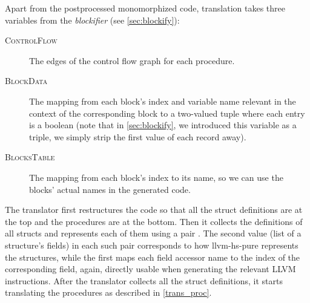 Apart from the postprocessed monomorphized code, translation takes three variables from the \emph{blockifier} (see \cref{sec:blockify}):

\begin{description}
    \item[\textsc{ControlFlow}] The edges of the control flow graph for each procedure.
    \item[\textsc{BlockData}] The mapping from each block's index and variable name relevant in the context of the corresponding block to a two-valued tuple \linebreak {} where each entry is a boolean (note that in \cref{sec:blockify}, we introduced this variable as a triple, we simply strip the first value of each record away).
    \item[\textsc{BlocksTable}] The mapping from each block's index to its name, so we can use the blocks' actual names in the generated code.
\end{description}

\sloppy The translator first restructures the code so that all the struct definitions are at the top and the procedures are at the bottom. Then it collects the definitions of all structs and represents each of them using a pair  . The second value (list of a structure's fields) in each such pair corresponds to how llvm-hs-pure represents the structures, while the first maps each field accessor name to the index of the corresponding field, again, directly usable when generating the relevant LLVM instructions. After the translator collects all the struct definitions, it starts translating the procedures as described in \cref{trans_proc}.

